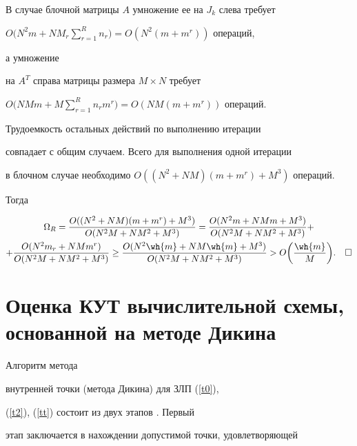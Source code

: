 В случае блочной матрицы $A$ умножение ее на $J_k$ слева требует


$O\Big(N^2m+NM_r\sum\limits_{r=1}^{R}n_r\Big)=O(N^2(m+m^r))$ операций,


а умножение


на $A^T$ справа матрицы размера $M\times N$ требует


$O\Big(NMm+M\sum\limits_{r=1}^{R}n_rm^r\Big)=O(NM(m+m^r))$ операций.


Трудоемкость остальных действий по выполнению итерации


совпадает с общим случаем. Всего для выполнения одной итерации


в блочном случае необходимо $O((N^2+NM)(m+m^r)+M^3)$ операций.


Тогда


\begin{multline*}


\Omega_R = \frac{O((N^2+NM)(m+m^r)+M^3)}


{O(N^2M+NM^2+M^3)}=


\frac{O(N^2m+NMm+M^3)}{O(N^2M+NM^2+M^3)}+ \\


%


+\frac{O(N^2m_r+NMm^r)}


{O(N^2M+NM^2+M^3)}\geq


\frac{O(N^2\wh{m}+NM\wh{m}+M^3)}{O(N^2M+NM^2+M^3)}


>O\bigg(\frac{\wh{m}}{M}\bigg).\quad\square


\end{multline*}








\section{ Оценка КУТ вычислительной схемы,\protect\\


основанной на методе Дикина}





Алгоритм метода


внутренней точки (метода Дикина) для ЗЛП (\ref{t0}),


(\ref{t2}), (\ref{tt}) состоит из двух этапов \cite{Dikin}. Первый


этап заключается в нахождении допустимой точки, удовлетворяющей


